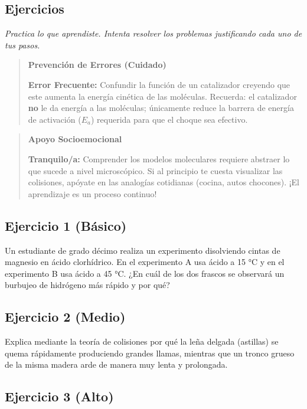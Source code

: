 \documentclass[
  spanish,
  letterpaper,
  12pt,
  oneside,
  open=any,
  DIV=15]{scrbook}
\begin{document}
\begin{tcolorbox}
\section{Ejercicios}\label{ejercicios-7}

\emph{Practica lo que aprendiste. Intenta resolver los problemas
justificando cada uno de tus pasos.}

\begin{quote}
\textbf{Prevención de Errores (Cuidado)}

\textbf{Error Frecuente:} Confundir la función de un catalizador
creyendo que este aumenta la energía cinética de las moléculas.
Recuerda: el catalizador \textbf{no} le da energía a las moléculas;
únicamente reduce la barrera de energía de activación (\(E_a\))
requerida para que el choque sea efectivo.
\end{quote}

\begin{quote}
\textbf{Apoyo Socioemocional}

\textbf{Tranquilo/a:} Comprender los modelos moleculares requiere
abstraer lo que sucede a nivel microscópico. Si al principio te cuesta
visualizar las colisiones, apóyate en las analogías cotidianas (cocina,
autos chocones). ¡El aprendizaje es un proceso continuo!
\end{quote}

\subsection{Ejercicio 1 (Básico)}\label{ejercicio-1-buxe1sico-7}

Un estudiante de grado décimo realiza un experimento disolviendo cintas
de magnesio en ácido clorhídrico. En el experimento A usa ácido a 15 °C
y en el experimento B usa ácido a 45 °C. ¿En cuál de los dos frascos se
observará un burbujeo de hidrógeno más rápido y por qué?

\subsection{Ejercicio 2 (Medio)}\label{ejercicio-2-medio-7}

Explica mediante la teoría de colisiones por qué la leña delgada
(astillas) se quema rápidamente produciendo grandes llamas, mientras que
un tronco grueso de la misma madera arde de manera muy lenta y
prolongada.

\subsection{Ejercicio 3 (Alto)}\label{ejercicio-3-alto-6}


\end{tcolorbox}
\end{document}
